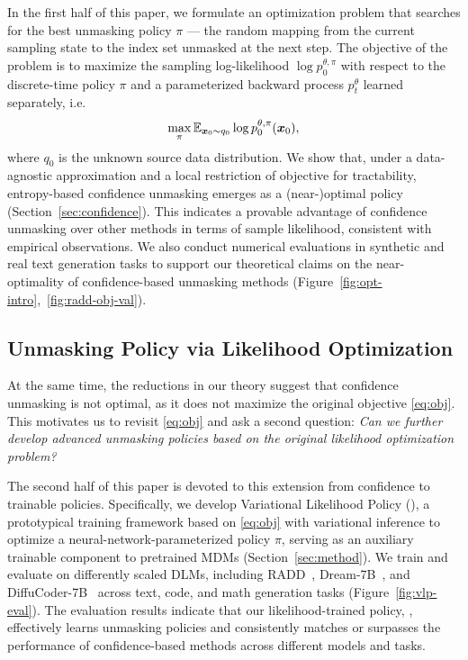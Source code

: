 In the first half of this paper, we formulate an optimization problem that searches for the best unmasking policy $\pi$ --- the random mapping from the current sampling state to the index set unmasked at the next step. The objective of the problem is to maximize the sampling log-likelihood $\log p_0^{\theta,\pi}$ with respect to the discrete-time policy $\pi$ and a parameterized backward process $p_t^\theta$ learned separately, i.e.
\begin{align}\label{eq:obj}
    \max_\pi \mathbb{E}_{\bm x_0\sim q_0}\log p^{\theta,\pi}_0(\bm x_0),
\end{align}
where $q_0$ is the unknown source data distribution. We show that, under a data-agnostic approximation and a local restriction of objective for tractability, entropy-based confidence unmasking emerges as a (near-)optimal policy (Section~\ref{sec:confidence}). This indicates a provable advantage of confidence unmasking over other methods in terms of sample likelihood, consistent with empirical observations. We also conduct numerical evaluations in synthetic and real text generation tasks to support our theoretical claims on the near-optimality of confidence-based unmasking methods (Figure~\ref{fig:opt-intro},~\ref{fig:radd-obj-val}).

\subsection{Unmasking Policy via Likelihood Optimization}
At the same time, the reductions in our theory suggest that confidence unmasking is not optimal, as it does not maximize the original objective \eqref{eq:obj}. This motivates us to revisit \eqref{eq:obj} and ask a second question: \emph{Can we further develop advanced unmasking policies based on the original likelihood optimization problem?}

The second half of this paper is devoted to this extension from confidence to trainable policies. Specifically, we develop Variational Likelihood Policy (\alg{}), a prototypical training framework based on \eqref{eq:obj} with variational inference to optimize a neural-network-parameterized policy $\pi$, serving as an auxiliary trainable component to pretrained MDMs (Section~\ref{sec:method}). We train and evaluate \alg{} on differently scaled DLMs, including RADD~\citep{ou2025absorbingdiscretediffusionsecretly}, Dream-7B~\citep{ye2025dream7bdiffusionlarge}, and DiffuCoder-7B~\citep{gong2025diffucoderunderstandingimprovingmasked} across text, code, and math generation tasks (Figure~\ref{fig:vlp-eval}). The evaluation results indicate that our likelihood-trained policy, \alg{}, effectively learns unmasking policies and consistently matches or surpasses the performance of confidence-based methods across different models and tasks.

